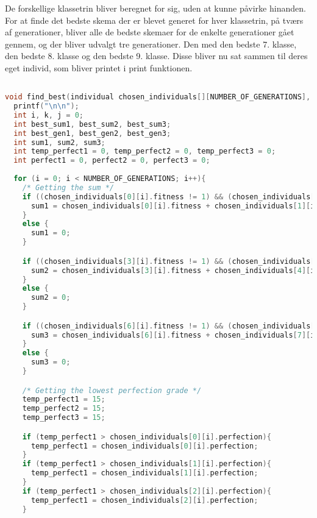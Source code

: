 De forskellige klassetrin bliver beregnet for sig, uden at kunne påvirke hinanden. For at finde det bedste skema der er blevet generet for hver klassetrin, på tværs af generationer, bliver alle de bedste skemaer for de enkelte generationer gået gennem, og der bliver udvalgt tre generationer. Den med den bedste 7. klasse, den bedste 8. klasse og den bedste 9. klasse. Disse bliver nu sat sammen til deres eget individ, som bliver printet i print funktionen. 

\begin{lstlisting}[language=c]

void find_best(individual chosen_individuals[][NUMBER_OF_GENERATIONS], individual best_of_best[]){
  printf("\n\n");
  int i, k, j = 0;
  int best_sum1, best_sum2, best_sum3;
  int best_gen1, best_gen2, best_gen3;
  int sum1, sum2, sum3;
  int temp_perfect1 = 0, temp_perfect2 = 0, temp_perfect3 = 0;
  int perfect1 = 0, perfect2 = 0, perfect3 = 0;
  
  for (i = 0; i < NUMBER_OF_GENERATIONS; i++){
    /* Getting the sum */
    if ((chosen_individuals[0][i].fitness != 1) && (chosen_individuals[1][i].fitness != 1) && (chosen_individuals[2][i].fitness != 1)){
      sum1 = chosen_individuals[0][i].fitness + chosen_individuals[1][i].fitness + chosen_individuals[2][i].fitness;
    }
    else {
      sum1 = 0;
    }

    if ((chosen_individuals[3][i].fitness != 1) && (chosen_individuals[4][i].fitness != 1) && (chosen_individuals[5][i].fitness != 1)){
      sum2 = chosen_individuals[3][i].fitness + chosen_individuals[4][i].fitness + chosen_individuals[5][i].fitness;
    }
    else {
      sum2 = 0;
    }

    if ((chosen_individuals[6][i].fitness != 1) && (chosen_individuals[7][i].fitness != 1) && (chosen_individuals[8][i].fitness != 1)){
      sum3 = chosen_individuals[6][i].fitness + chosen_individuals[7][i].fitness + chosen_individuals[8][i].fitness;
    }
    else {
      sum3 = 0;
    }

    /* Getting the lowest perfection grade */
    temp_perfect1 = 15;
    temp_perfect2 = 15;
    temp_perfect3 = 15;

    if (temp_perfect1 > chosen_individuals[0][i].perfection){
      temp_perfect1 = chosen_individuals[0][i].perfection;
    }
    if (temp_perfect1 > chosen_individuals[1][i].perfection){
      temp_perfect1 = chosen_individuals[1][i].perfection;
    }
    if (temp_perfect1 > chosen_individuals[2][i].perfection){
      temp_perfect1 = chosen_individuals[2][i].perfection;
    }


\end{lstlisting}

